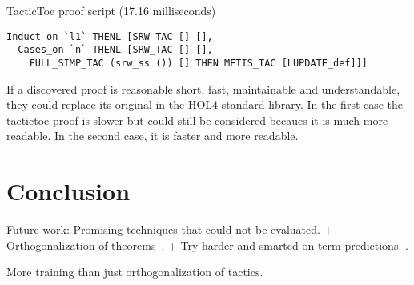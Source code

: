 \documentclass[runningheads,a4paper,draft]{svjour3}
\def\holfour{\textsf{HOL4}\xspace}
\def\hollight{\textsf{HOL Light}\xspace}
\def\tactictoe{\textsf{TacticToe}\xspace}
\begin{document}
\begin{example}



\vspace{5mm}

\tactictoe proof script (17.16 milliseconds)
\begin{lstlisting}[language=SMLSmall,frame=tb]
Induct_on `l1` THENL [SRW_TAC [] [],
  Cases_on `n` THENL [SRW_TAC [] [],
    FULL_SIMP_TAC (srw_ss ()) [] THEN METIS_TAC [LUPDATE_def]]]
\end{lstlisting}


If a discovered proof is reasonable short, fast, maintainable  and 
understandable, they could 
replace its original in the \holfour standard library. In the first case the 
tactictoe proof is slower but could still be considered becaues it is much more 
readable. In the second case, it is faster and more readable.



%






\end{example}

\section{Conclusion}\label{sec:concl}

Future work:
  Promising techniques that could not be evaluated. 
  + Orthogonalization of theorems~\cite{ckju-jsc15}. 
  + Try harder and smarted on term predictions. \cite{latest version of sepia}. 
  \cite{conjecturing}
 
More training than just orthogonalization of tactics.

\end{document}
